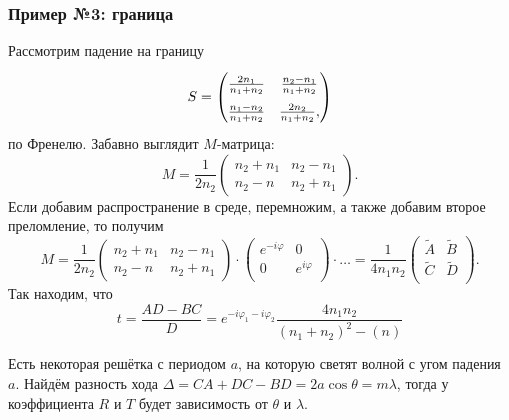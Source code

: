 \subsubsection*{Пример №3: граница}

Рассмотрим падение на границу
\begin{equation*}
    S = \begin{pmatrix}
    \vphantom{\dfrac{1}{2}}
        \frac{2n_1}{n_1 + n_2} & \frac{n_2-n_1}{n_1 + n_2} \\ 
    \vphantom{\dfrac{1}{2}}
        \frac{n_1-n_2}{n_1+n_2} & \frac{2 n_2}{n_1 + n_2},
    \end{pmatrix}
\end{equation*}
по Френелю. Забавно выглядит $M$-матрица:
\begin{equation*}
    M  = \frac{1}{2n_2} \begin{pmatrix}
        n_2 + n_1 & n_2-n_1 \\
        n_2-n & n_2 + n_1
    \end{pmatrix}.
\end{equation*}
Если добавим распространение в среде, перемножим, а также добавим второе преломление, то получим
\begin{equation*}
    M = \frac{1}{2n_2} \begin{pmatrix}
        n_2 + n_1 & n_2-n_1 \\
        n_2-n & n_2 + n_1
    \end{pmatrix} 
    \cdot 
    \begin{pmatrix}
        e^{- i \varphi} & 0 \\
        0 & e^{i \varphi} \\
    \end{pmatrix}
    \cdot \ldots
    = 
    \frac{1}{4n_1 n_2} \begin{pmatrix}
        \tilde{A} & \tilde{B} \\
        \tilde{C} & \tilde{D} \\
    \end{pmatrix}.
\end{equation*}
Так находим, что
\begin{equation*}
    t = \frac{AD - BC}{D} = e^{-i \varphi_1 - i \varphi_2} \frac{4 n_1 n_2}{(n_1+n_2)^2-(n)}
\end{equation*}


Есть некоторая решётка с периодом $a$, на которую светят волной с угом падения $a$. 
Найдём разность хода $\Delta = CA+DC-BD = 2 a \cos \theta = m \lambda$, тогда у коэффициента $R$ и $T$ будет зависимость от $\theta$ и $\lambda$.

